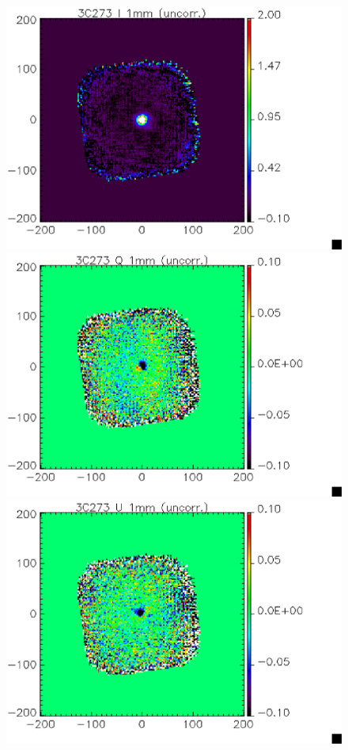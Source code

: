 \documentclass[a4paper,10pt]{article}
\begin{document}
\begin{figure}
\begin{center}
\includegraphics[clip, angle=0, scale = 0.3]{figures/I_3C273_1mm_uncorr.eps}
\includegraphics[clip, angle=0, scale = 0.3]{figures/Q_3C273_1mm_uncorr.eps}
\includegraphics[clip, angle=0, scale = 0.3]{figures/U_3C273_1mm_uncorr.eps}

\end{center}
\end{figure}
\end{document}
